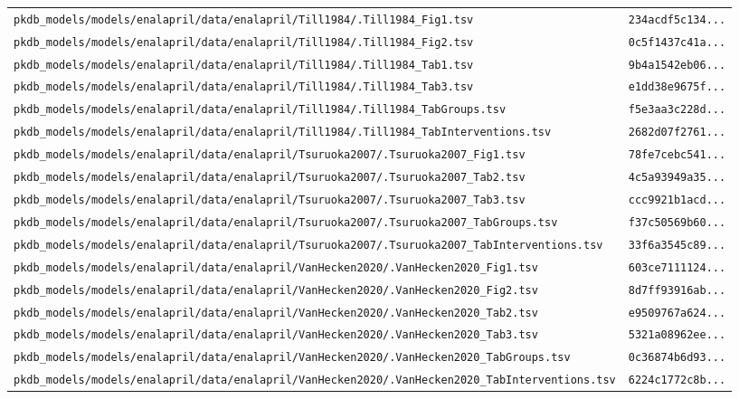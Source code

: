\documentclass{article}
\begin{document}
\begin{longtable}{ll}
\texttt{pkdb\_models/models/enalapril/data/enalapril/Till1984/.Till1984\_Fig1.tsv} & \texttt{234acdf5c134...} \\
\texttt{pkdb\_models/models/enalapril/data/enalapril/Till1984/.Till1984\_Fig2.tsv} & \texttt{0c5f1437c41a...} \\
\texttt{pkdb\_models/models/enalapril/data/enalapril/Till1984/.Till1984\_Tab1.tsv} & \texttt{9b4a1542eb06...} \\
\texttt{pkdb\_models/models/enalapril/data/enalapril/Till1984/.Till1984\_Tab3.tsv} & \texttt{e1dd38e9675f...} \\
\texttt{pkdb\_models/models/enalapril/data/enalapril/Till1984/.Till1984\_TabGroups.tsv} & \texttt{f5e3aa3c228d...} \\
\texttt{pkdb\_models/models/enalapril/data/enalapril/Till1984/.Till1984\_TabInterventions.tsv} & \texttt{2682d07f2761...} \\
\texttt{pkdb\_models/models/enalapril/data/enalapril/Tsuruoka2007/.Tsuruoka2007\_Fig1.tsv} & \texttt{78fe7cebc541...} \\
\texttt{pkdb\_models/models/enalapril/data/enalapril/Tsuruoka2007/.Tsuruoka2007\_Tab2.tsv} & \texttt{4c5a93949a35...} \\
\texttt{pkdb\_models/models/enalapril/data/enalapril/Tsuruoka2007/.Tsuruoka2007\_Tab3.tsv} & \texttt{ccc9921b1acd...} \\
\texttt{pkdb\_models/models/enalapril/data/enalapril/Tsuruoka2007/.Tsuruoka2007\_TabGroups.tsv} & \texttt{f37c50569b60...} \\
\texttt{pkdb\_models/models/enalapril/data/enalapril/Tsuruoka2007/.Tsuruoka2007\_TabInterventions.tsv} & \texttt{33f6a3545c89...} \\
\texttt{pkdb\_models/models/enalapril/data/enalapril/VanHecken2020/.VanHecken2020\_Fig1.tsv} & \texttt{603ce7111124...} \\
\texttt{pkdb\_models/models/enalapril/data/enalapril/VanHecken2020/.VanHecken2020\_Fig2.tsv} & \texttt{8d7ff93916ab...} \\
\texttt{pkdb\_models/models/enalapril/data/enalapril/VanHecken2020/.VanHecken2020\_Tab2.tsv} & \texttt{e9509767a624...} \\
\texttt{pkdb\_models/models/enalapril/data/enalapril/VanHecken2020/.VanHecken2020\_Tab3.tsv} & \texttt{5321a08962ee...} \\
\texttt{pkdb\_models/models/enalapril/data/enalapril/VanHecken2020/.VanHecken2020\_TabGroups.tsv} & \texttt{0c36874b6d93...} \\
\texttt{pkdb\_models/models/enalapril/data/enalapril/VanHecken2020/.VanHecken2020\_TabInterventions.tsv} & \texttt{6224c1772c8b...} \\

\end{longtable}
\end{document}
